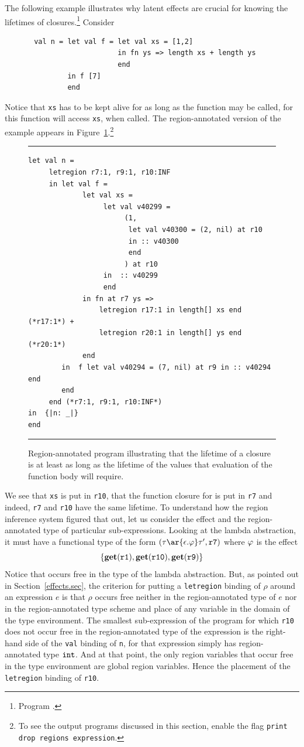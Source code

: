 \documentclass[12pt]{book}
\begin{document}
The following example illustrates why latent effects are crucial for
knowing the lifetimes of closures.\footnote{Program .} Consider
\begin{verbatim}
       val n = let val f = let val xs = [1,2]
                           in fn ys => length xs + length ys
                           end
               in f [7]
               end
\end{verbatim}
Notice that {\tt xs} has to be kept alive for as long as the
function  may be called, for this function
will access {\tt xs}, when called.
The region-annotated version of the example appears in Figure~\ref{lambda1.fig}.\footnote{To
see the output programs discussed in this section, enable the flag
\texttt{print drop regions expression}.}
\begin{figure}
\hrule \medskip
\begin{verbatim}
let val n = 
     letregion r7:1, r9:1, r10:INF 
     in let val f = 
             let val xs = 
                  let val v40299 = 
                       (1, 
                        let val v40300 = (2, nil) at r10 
                        in :: v40300 
                        end 
                       ) at r10
                  in  :: v40299
                  end 
             in fn at r7 ys => 
                 letregion r17:1 in length[] xs end (*r17:1*) + 
                 letregion r20:1 in length[] ys end (*r20:1*)
             end 
        in  f let val v40294 = (7, nil) at r9 in :: v40294 end 
        end  
     end (*r7:1, r9:1, r10:INF*)
in  {|n: _|}
end 
\end{verbatim}
\caption{Region-annotated program illustrating that the lifetime of
a closure is at least as long as the lifetime of the values that evaluation
of the function body will require.}
\medskip
\hrule
\label{lambda1.fig}
\end{figure}
We see that {\tt xs} is put in {\tt r10}, that the
function closure for  is put in {\tt r7}
and indeed, {\tt r7} and {\tt r10} have the
same lifetime. To understand how the region inference system figured that out, 
let us consider the effect and the 
region-annotated type of particular sub-expressions. Looking at the lambda
abstraction, it must have a functional type of the form 
$(\tau\ar{\epsilon.\rea}\tau', {\tt r7})$ where $\varphi$ is the
effect
$$\{\mathop{\bf get}\nolimits(\hbox{\tt r1}), \mathop{\bf get}\nolimits(\hbox{\tt r10}), \mathop{\bf get}\nolimits(\hbox{\tt r9})\}$$
Notice that  occurs free in the type of the
lambda abstraction. But, as pointed out in Section~\ref{effects.sec},
the criterion
for putting a {\tt letregion} binding of $\rho$ around an expression $e$
is that $\rho$ occurs free neither in the region-annotated type of $e$ nor
in the region-annotated type scheme and place of any variable in the domain of the
type environment. The smallest sub-expression
of the program for which {\tt r10} does not occur free in
the region-annotated type  of the expression is the right-hand side 
of the {\tt val} binding of {\tt n}, for that expression
simply has region-annotated type $\hbox{\tt int}$.
And at that point, the only region variables that occur free in
the type environment are global region variables.
Hence the placement of the {\tt letregion} binding of {\tt r10}.
\end{document}

